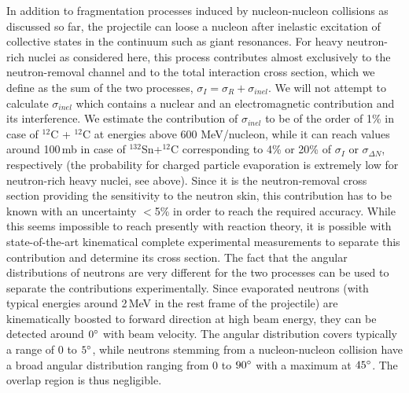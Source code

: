\documentclass[english,aps,prl,twocolumn,superscriptaddress]{revtex4}
\begin{document}
In addition to fragmentation processes induced by nucleon-nucleon collisions as discussed so far, the projectile can loose a nucleon after inelastic excitation of collective states in the continuum such as giant resonances. For heavy neutron-rich nuclei as considered here, this process contributes almost exclusively to the neutron-removal channel and to the total interaction cross section, which we define as the sum of the two processes, $\sigma_{I}=\sigma_{R}+\sigma_{inel}$. We will not attempt to calculate  $\sigma_{inel}$ which contains a nuclear and an electromagnetic contribution and its interference. We estimate the contribution of $\sigma_{inel}$ to be of the order of 1\% in case of $^{12}$C + $^{12}$C at energies above 600 MeV/nucleon, while it can reach values around 100\,mb in case of $^{132}$Sn+$^{12}$C \cite{Schr15,Schi17} corresponding to 4\% or 20\% of $\sigma_{I}$ or $\sigma_{\Delta N}$, respectively (the probability for charged particle evaporation is extremely low for neutron-rich heavy nuclei, see above). Since it is the neutron-removal cross section providing the sensitivity to the neutron skin, this contribution has to be known with an uncertainty $<$5\% in order to reach the required accuracy. While this seems impossible to reach presently with reaction theory, it is possible with state-of-the-art kinematical complete experimental measurements to separate this contribution and determine its cross section. The fact that the angular distributions of neutrons are very different for the two processes can be used to separate the contributions experimentally. Since evaporated neutrons (with typical energies around 2\,MeV in the rest frame of the projectile) are kinematically boosted to forward direction at high beam energy, they can be detected around $0\degree$  with beam velocity. The angular distribution covers typically a range of $0$ to $5\degree$, while neutrons stemming from a nucleon-nucleon collision have a broad angular distribution ranging from 0 to $90\degree$  with a maximum at $45\degree$. The overlap region is thus negligible. 
\end{document}
